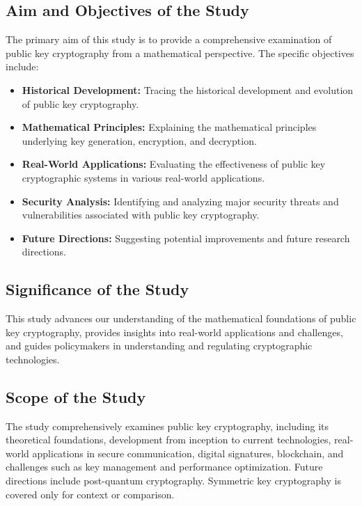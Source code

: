 \documentclass[12pt]{article}
\begin{document}
\subsection{Aim and Objectives of the Study}
The primary aim of this study is to provide a comprehensive examination of public key cryptography from a mathematical perspective. The specific objectives include:
\begin{itemize}
    \item \textbf{Historical Development:} Tracing the historical development and evolution of public key cryptography.
    \item \textbf{Mathematical Principles:} Explaining the mathematical principles underlying key generation, encryption, and decryption.
    \item \textbf{Real-World Applications:} Evaluating the effectiveness of public key cryptographic systems in various real-world applications.
    \item \textbf{Security Analysis:} Identifying and analyzing major security threats and vulnerabilities associated with public key cryptography.
    \item \textbf{Future Directions:} Suggesting potential improvements and future research directions.
\end{itemize}

\subsection{Significance of the Study}
This study advances our understanding of the mathematical foundations of public key cryptography, provides insights into real-world applications and challenges, and guides policymakers in understanding and regulating cryptographic technologies.

\subsection{Scope of the Study}
The study comprehensively examines public key cryptography, including its theoretical foundations, development from inception to current technologies, real-world applications in secure communication, digital signatures, blockchain, and challenges such as key management and performance optimization. Future directions include post-quantum cryptography. Symmetric key cryptography is covered only for context or comparison.
\end{document}
